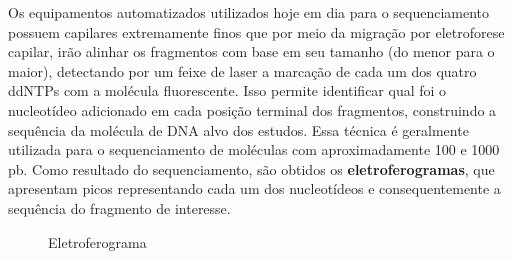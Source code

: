 \documentclass[
  letterpaper,
  DIV=11,
  numbers=noendperiod]{scrreprt}
\begin{document}
Os equipamentos automatizados utilizados hoje em dia para o
sequenciamento possuem capilares extremamente finos que por meio da
migração por eletroforese capilar, irão alinhar os fragmentos com base
em seu tamanho (do menor para o maior), detectando por um feixe de laser
a marcação de cada um dos quatro ddNTPs com a molécula fluorescente.
Isso permite identificar qual foi o nucleotídeo adicionado em cada
posição terminal dos fragmentos, construindo a sequência da molécula de
DNA alvo dos estudos. Essa técnica é geralmente utilizada para o
sequenciamento de moléculas com aproximadamente 100 e 1000 pb. Como
resultado do sequenciamento, são obtidos os \textbf{eletroferogramas},
que apresentam picos representando cada um dos nucleotídeos e
consequentemente a sequência do fragmento de interesse.

\begin{figure}

\begin{minipage}[t]{\linewidth}

{\centering 


\caption{Eletroferograma}

}

\end{minipage}%

\end{figure}
\end{document}
